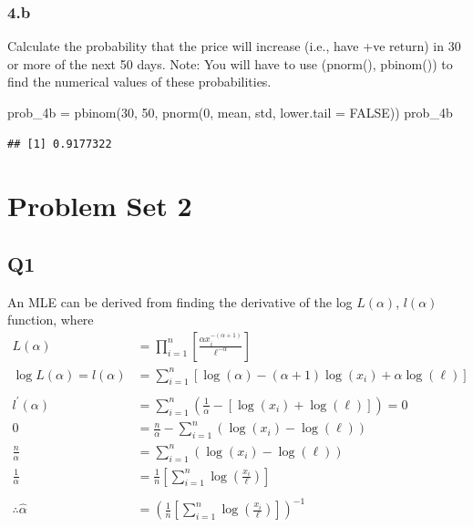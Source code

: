 \documentclass[
  oneside]{book}
\newenvironment{Shaded}{\begin{snugshade}}{\end{snugshade}}
\newcommand{\AttributeTok}[1]{\textcolor[rgb]{0.77,0.63,0.00}{#1}}
\newcommand{\ConstantTok}[1]{\textcolor[rgb]{0.00,0.00,0.00}{#1}}
\newcommand{\DecValTok}[1]{\textcolor[rgb]{0.00,0.00,0.81}{#1}}
\newcommand{\FunctionTok}[1]{\textcolor[rgb]{0.00,0.00,0.00}{#1}}
\newcommand{\NormalTok}[1]{#1}
\newcommand{\OtherTok}[1]{\textcolor[rgb]{0.56,0.35,0.01}{#1}}
\begin{document}
\hypertarget{b-1}{%
\subsection{4.b}\label{b-1}}

Calculate the probability that the price will increase (i.e., have +ve return) in 30
or more of the next 50 days.
Note: You will have to use (pnorm(), pbinom()) to find the numerical values of these probabilities.

\begin{Shaded}
\begin{Highlighting}[]
\NormalTok{prob\_4b }\OtherTok{=} \FunctionTok{pbinom}\NormalTok{(}\DecValTok{30}\NormalTok{, }\DecValTok{50}\NormalTok{, }\FunctionTok{pnorm}\NormalTok{(}\DecValTok{0}\NormalTok{, mean, std, }\AttributeTok{lower.tail =} \ConstantTok{FALSE}\NormalTok{))}
\NormalTok{prob\_4b}
\end{Highlighting}
\end{Shaded}

\begin{verbatim}
## [1] 0.9177322
\end{verbatim}

\hypertarget{problem-set-2}{%
\chapter{Problem Set 2}\label{problem-set-2}}

\hypertarget{q1-1}{%
\section{Q1}\label{q1-1}}

An MLE can be derived from finding the derivative of the log \(L(\alpha)\), \(l(\alpha)\) function, where\\
\[
\begin{aligned}
L(\alpha) &= \prod^{n}_{i=1} \left[ \frac{\alpha x_{i}^{-(\alpha+1)}}{\ell^{-\alpha}} \right]\\
\log L(\alpha) = l(\alpha) &= \sum^{n}_{i=1} \left[ \log(\alpha) - (\alpha+1)\log(x_{i}) +\alpha\log(\ell) \right]\\
\\
l^{'}(\alpha) &= \sum^{n}_{i=1} \left( \frac{1}{\alpha} - [\log (x_{i}) + \log(\ell)]\right) = 0\\
0 &= \frac{n}{\alpha} - \sum^{n}_{i=1} \left( \log(x_{i}) -\log(\ell) \right)\\
\frac{n}{\alpha} &= \sum^{n}_{i=1} \left( \log(x_{i}) -\log(\ell) \right)\\
\frac{1}{\alpha} &= \frac{1}{n} \left[ \sum^{n}_{i=1}\log\left( \frac{x_{i}}{\ell} \right) \right]\\
\\
\therefore \hat{\alpha} &= \left(  \frac{1}{n} \left[ \sum^{n}_{i=1}\log\left( \frac{x_{i}}{\ell} \right) \right] \right)^{-1}
\end{aligned}
\]
\end{document}
